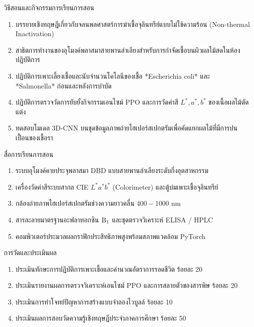\newpage

\begin{planbox}{วิธีสอนและกิจกรรมการเรียนการสอน}
\begin{enumerate}
    \item บรรยายเชิงทฤษฎีเกี่ยวกับจลนพลศาสตร์การฆ่าเชื้อจุลินทรีย์แบบไม่ใช้ความร้อน (Non-thermal Inactivation)
    \item สาธิตการทำงานของอุโมงค์พลาสมาสายพานลำเลียงสำหรับการกำจัดเชื้อบนผิวผลไม้สดในห้องปฏิบัติการ
    \item ปฏิบัติการเพาะเลี้ยงเชื้อและนับจำนวนโคโลนีของเชื้อ *Escherichia coli* และ *Salmonella* ก่อนและหลังการบำบัด
    \item ปฏิบัติการตรวจวัดการยับยั้งกิจกรรมเอนไซม์ PPO และการวัดค่าสี $L^*, a^*, b^*$ ของเนื้อผลไม้ตัดแต่ง
    \item ทดสอบโมเดล 3D-CNN บนชุดข้อมูลภาพถ่ายไฮเปอร์สเปกตรัมเพื่อคัดแยกผลไม้ที่มีการปนเปื้อนของเชื้อรา
\end{enumerate}
\end{planbox}

\begin{planbox}{สื่อการเรียนการสอน}
\begin{enumerate}
    \item ระบบอุโมงค์คายประจุพลาสมา DBD แบบสายพานลำเลียงระดับกึ่งอุตสาหกรรม
    \item เครื่องวัดค่าสีระบบสากล CIE $L^*a^*b^*$ (Colorimeter) และตู้บ่มเพาะเชื้อจุลินทรีย์
    \item กล้องถ่ายภาพไฮเปอร์สเปกตรัมช่วงความยาวคลื่น $400 - 1000 \text{ nm}$
    \item สารละลายมาตรฐานอะฟลาทอกซิน $\ce{B1}$ และชุดตรวจวิเคราะห์ ELISA / HPLC
    \item คอมพิวเตอร์ประมวลผลกราฟิกประสิทธิภาพสูงพร้อมสภาพแวดล้อม PyTorch
\end{enumerate}
\end{planbox}

\begin{planbox}{การวัดและประเมินผล}
\begin{enumerate}
    \item ประเมินทักษะการปฏิบัติการเพาะเชื้อและคำนวณอัตราการรอดชีวิต ร้อยละ 20
    \item ประเมินรายงานผลการตรวจวิเคราะห์เอนไซม์ PPO และการสลายตัวของสารพิษ ร้อยละ 20
    \item ประเมินการทำโจทย์ปัญหาการสร้างแบบจำลองไวบูลล์ ร้อยละ 10
    \item ประเมินผลการสอบวัดความรู้เชิงทฤษฎีประจำภาคการศึกษา ร้อยละ 50
\end{enumerate}
\end{planbox}

